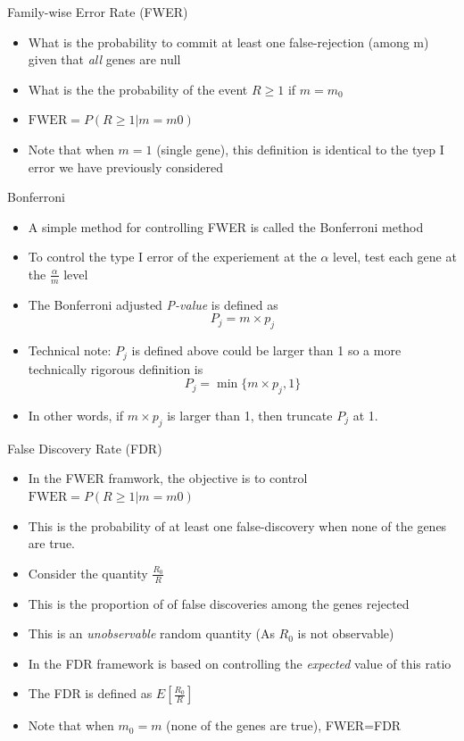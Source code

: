 \documentclass[xcolor=x11names,compress]{beamer}\usepackage[]{graphicx}\usepackage[]{color}
\begin{document}
\begin{frame}{Family-wise Error Rate (FWER)}
  \begin{itemize}
  \item What is the probability to commit at least one false-rejection (among m) given that 
        {\it all} genes are null
  \item What is the the probability of the event $R\ge 1$ if $m=m_0$
  \item $\mathrm{FWER}=P(R\ge 1|m=m0)$
  \item Note that when $m=1$ (single gene), this definition is identical to the tyep I error
        we have previously considered
  \end{itemize}
\end{frame}

\begin{frame}{Bonferroni}
  \begin{itemize}
  \item A simple method for controlling FWER is called the Bonferroni method
  \item To control the type I error of the experiement at the 
        $\alpha$ level, test each gene at the $\frac{\alpha}{m}$ level
  \item The Bonferroni adjusted {\it P-value} is defined as
    \begin{equation*}
      P_j=m \times p_j
    \end{equation*}
  \item Technical note: $P_j$ is defined above could be larger than 1 so a more technically rigorous definition is
    \begin{equation*}
      P_j=\min\{m \times p_j,1\}
    \end{equation*}
  \item In other words, if $m \times p_j$ is larger than 1, then truncate $P_j$ at 1.
  \end{itemize}
\end{frame}


\begin{frame}{False Discovery Rate (FDR)}
  \begin{itemize}
  \item In the FWER framwork, the objective is to control $\mathrm{FWER}=P(R\ge 1|m=m0)$
  \item This is the probability of at least one false-discovery when none of the genes are true.
  \item Consider the quantity $\frac{R_0}{R}$
  \item This is the proportion of of false discoveries among the genes rejected
  \item This is an {\it unobservable} random quantity (As $R_0$ is not observable)
   \item In the FDR framework is based on controlling the {\it expected} value of this ratio
    \item The FDR is defined as $E[\frac{R_0}{R}]$
    \item Note that when $m_0=m$ (none of the genes are true), FWER=FDR
  \end{itemize}
\end{frame}
\end{document}
